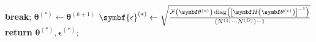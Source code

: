 \begin{algorithm}
\begin{algorithmic}[1]
                \EndIf\label{state:neg-amp-end}
                    \State \textbf{break};
                \EndIf
            \EndFor
            \State $\symbf{\theta}^{(*)} \gets \symbf{\theta}^{(k+1)}$
            \State $\symbf{\epsilon}^{(*)} \gets
                \sqrt{
                    \frac
                    {
                        \Fthstar \diag \left(
                            \left[\bdHthstar\right]^{-1}
                        \right)
                    }
                    {(\None \cdots \ND) - 1}
                }$
            \State \textbf{return} $\symbf{\theta}^{(*)}, \symbf{\epsilon}^{(*)}$;
        \EndProcedure
    \end{algorithmic}
\end{algorithm}



